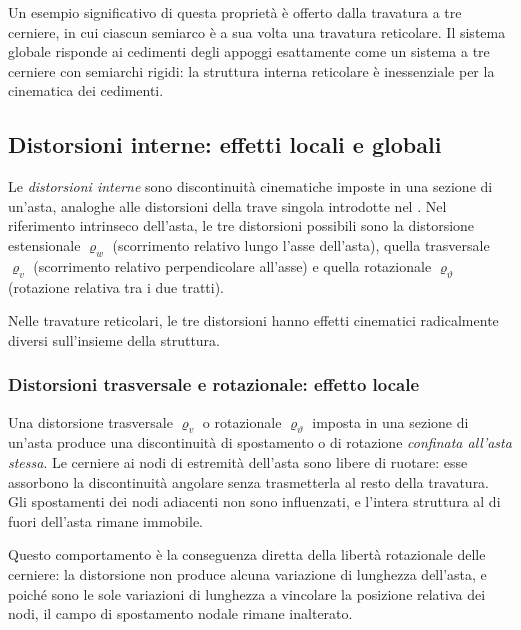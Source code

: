 Un esempio significativo di questa proprietà è
offerto dalla travatura a tre cerniere, in cui
ciascun semiarco è a sua volta una travatura
reticolare. Il sistema globale risponde ai cedimenti
degli appoggi esattamente come un sistema a tre
cerniere con semiarchi rigidi: la struttura interna
reticolare è inessenziale per la cinematica dei
cedimenti.

\subsection{Distorsioni interne: effetti locali e globali}
\label{subsec:distorsioni_reticolare}


Le \emph{distorsioni interne} sono discontinuità
cinematiche imposte in una sezione di un'asta,
analoghe alle distorsioni della trave singola
introdotte nel . Nel
riferimento intrinseco dell'asta, le tre distorsioni
possibili sono la distorsione estensionale $\varrho_w$
(scorrimento relativo lungo l'asse dell'asta), quella
trasversale $\varrho_v$ (scorrimento relativo
perpendicolare all'asse) e quella rotazionale
$\varrho_\vartheta$ (rotazione relativa tra i due
tratti).

Nelle travature reticolari, le tre distorsioni hanno
effetti cinematici radicalmente diversi sull'insieme
della struttura.

\subsubsection{Distorsioni trasversale e rotazionale: 	effetto locale}
Una distorsione trasversale $\varrho_v$ o rotazionale
$\varrho_\vartheta$ imposta in una sezione di un'asta
produce una discontinuità di spostamento o di rotazione
\emph{confinata all'asta stessa}. Le cerniere ai nodi
di estremità dell'asta sono libere di ruotare: esse
assorbono la discontinuità angolare senza trasmetterla
al resto della travatura. Gli spostamenti dei nodi
adiacenti non sono influenzati, e l'intera struttura
al di fuori dell'asta rimane immobile.

Questo comportamento è la conseguenza diretta della
libertà rotazionale delle cerniere: la distorsione
non produce alcuna variazione di lunghezza dell'asta,
e poiché sono le sole variazioni di lunghezza a
vincolare la posizione relativa dei nodi, il campo
di spostamento nodale rimane inalterato.

